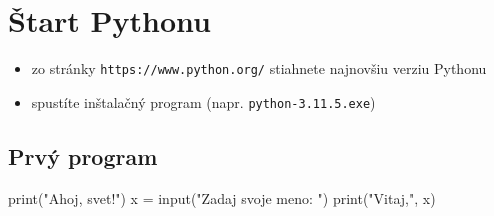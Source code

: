 \documentclass[a4paper,12pt]{report}
\begin{document}
	
	\chapter{Štart Pythonu}
	
	\begin{tcolorbox}[mybox={Ako ho získať}]
		\begin{itemize}
			\item zo stránky \texttt{https://www.python.org/} stiahnete najnovšiu verziu Pythonu
			\item spustíte inštalačný program (napr. \texttt{python-3.11.5.exe})
		\end{itemize}
	\end{tcolorbox}
	
	\section{Prvý program}
	
	\begin{tcolorbox}[codebox={Ukážkový kód}]
		print("Ahoj, svet!")
		x = input("Zadaj svoje meno: ")
		print("Vitaj,", x)
	\end{tcolorbox}
	
\end{document}
